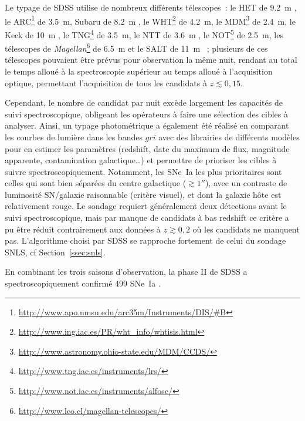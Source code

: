 \documentclass[../main/main.tex]{subfiles}
\begin{document}
Le typage de SDSS utilise de nombreux différents télescopes~: le HET de
\SI{9,2}{m} \citep{hill1998}, le
ARC\footnote{\href{http://www.apo.nmsu.edu/arc35m/Instruments/DIS/\#B}
{http://www.apo.nmsu.edu/arc35m/Instruments/DIS/\#B}} de \SI{3,5}{m}, Subaru de
\SI{8,2}{m} \citep{kashikawa2000}, le
WHT\footnote{\href{http://www.ing.iac.es/PR/wht_info/whtisis.html}
{http://www.ing.iac.es/PR/wht\_info/whtisis.html}} de \SI{4,2}{m}, le
MDM\footnote{\href{http://www.astronomy.ohio-state.edu/MDM/CCDS/}
{http://www.astronomy.ohio-state.edu/MDM/CCDS/}} de \SI{2,4}{m}, le Keck de
\SI{10}{m} \citep{oke1995}, le
TNG\footnote{\href{http://www.tng.iac.es/instruments/lrs/}
{http://www.tng.iac.es/instruments/lrs/}} de \SI{3,5}{m}, le NTT de \SI{3,6}{m}
\citep{dekker1986}, le
NOT\footnote{\href{http://www.not.iac.es/instruments/alfosc/}
{http://www.not.iac.es/instruments/alfosc/}} de \SI{2,5}{m}, les télescopes de
\textit{Magellan}\footnote{\href{http://www.lco.cl/magellan-telescopes/}
{http://www.lco.cl/magellan-telescopes/}} de \SI{6,5}{m} et le SALT de
\SI{11}{m} \citep{burgh2003}~; plusieurs de ces télescopes pouvaient être prévus
pour observation la même nuit, rendant au total le temps alloué à la
spectroscopie supérieur au temps alloué à l'acquisition optique, permettant
l'acquisition de tous les candidats à $z \lesssim 0,15$.

Cependant, le nombre de candidat par nuit excède largement les capacités de
suivi spectroscopique, obligeant les opérateurs à faire une sélection des cibles
à analyser. Ainsi, un typage photométrique a également été réalisé en comparant
les courbes de lumière dans les bandes $gri$ avec des librairies de différents
modèles pour en estimer les paramètres (redshift, date du maximum de flux,
magnitude apparente, contamination galactique…) et permettre de prioriser les
cibles à suivre spectroscopiquement. Notamment, les SNe~Ia les plus prioritaires
sont celles qui sont bien séparées du centre galactique ($\gtrsim \ang{;;1}$),
avec un contraste de luminosité SN/galaxie raisonnable (critère visuel), et dont
la galaxie hôte est relativement rouge. Le sondage requiert généralement deux
détections avant le suivi spectroscopique, mais par manque de candidats à bas
redshift ce critère a pu être réduit contrairement aux données à $z \gtrsim 0,2$
où les candidats ne manquent pas. L'algorithme choisi par SDSS se rapproche
fortement de celui du sondage SNLS, cf Section~\ref{ssec:snls}.

En combinant les trois saisons d'observation, la phase II de SDSS a
spectroscopiquement confirmé 499 SNe~Ia \citep{sako2018}.
\end{document}
